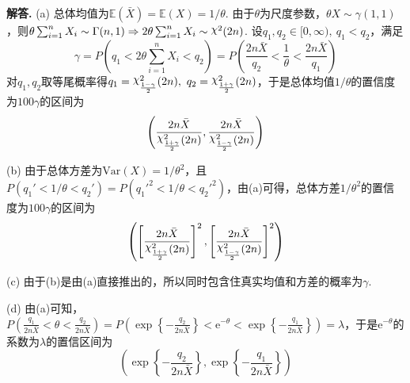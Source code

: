 \documentclass[12pt, a4paper, oneside]{ctexart}
\newenvironment{solution}[1][]{\par\noindent\textbf{#1解答. }}{\smallskip\par}  %
\DeclareRobustCommand{\rchi}{{\mathpalette\irchi\relax}}
\newcommand{\irchi}[2]{\raisebox{\depth}{$#1\chi$}} %
\def\E{\mathbb{E}}          %
\def\var{\text{Var}}        %
\def\e{\mathrm{e}}          %
\def\add{\vspace{1ex}}      %
\begin{document}
\begin{solution}
    (a) 总体均值为$\E(\bar{X}) = \E(X) = 1/\theta$. 由于$\theta$为尺度参数，$\theta X\sim \gamma(1,1)$，则$\theta\sum_{i=1}^nX_i\sim \Gamma(n,1)\Rightarrow 2\theta\sum_{i=1}^nX_i\sim\rchi^2(2n)$. 设$q_1,q_2\in[0,\infty),\ q_1<q_2$，满足
    \begin{equation*}
        \gamma = P(q_1 < 2\theta\sum_{i=1}^nX_i < q_2) = P\left(\frac{2n\bar{X}}{q_2}<\frac{1}{\theta}<\frac{2n\bar{X}}{q_1}\right)
    \end{equation*}
    对$q_1,q_2$取等尾概率得$q_1 = \rchi^2_{\frac{1-\gamma}{2}}(2n),\ q_2=\rchi^2_{\frac{1+\gamma}{2}}(2n)$，于是总体均值$1/\theta$的置信度为$100\gamma$的区间为
    \begin{equation*}
        \left(\frac{2n\bar{X}}{\rchi^2_{\frac{1+\gamma}{2}}(2n)}, \frac{2n\bar{X}}{\rchi^2_{\frac{1-\gamma}{2}}(2n)}\right)
    \end{equation*}

    (b) 由于总体方差为$\var(X) = 1/\theta^2$，且$P(q_1'<1/\theta<q_2') = P(q_1'^2<1/\theta<q_2'^2)$，由(a)可得，总体方差$1/\theta^2$的置信度为$100\gamma$的区间为
    \begin{equation*}
        \left(\left[\frac{2n\bar{X}}{\rchi^2_{\frac{1+\gamma}{2}}(2n)}\right]^2, \left[\frac{2n\bar{X}}{\rchi^2_{\frac{1-\gamma}{2}}(2n)}\right]^2\right)
    \end{equation*}

    (c) 由于(b)是由(a)直接推出的，所以同时包含住真实均值和方差的概率为$\gamma$.\add

    (d) 由(a)可知，$P\left(\frac{q_1}{2n\bar{X}} < \theta < \frac{q_2}{2n\bar{X}}\right) = P\left(\exp\left\{-\frac{q_2}{2n\bar{X}}\right\}<\e^{-\theta}<\exp\left\{-\frac{q_1}{2n\bar{X}}\right\}\right) = \lambda$，\add 于是$\e^{-\theta}$的系数为$\lambda$的置信区间为
    \begin{equation*}
        \left(\exp\left\{-\frac{q_2}{2n\bar{X}}\right\},\exp\left\{-\frac{q_1}{2n\bar{X}}\right\}\right)
    \end{equation*}


\end{solution}
\end{document}
